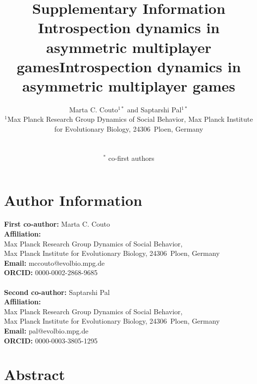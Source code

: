 \documentclass[11pt]{article}
\title{\sffamily \Large Supplementary Information\\[0.1cm] {\bfseries Introspection dynamics in asymmetric multiplayer games}}
\title{\sffamily \Large {\bfseries Introspection dynamics in asymmetric multiplayer games}}
\date{\empty}
\author{\parbox[c]{16cm}{\centering \onehalfspacing \fontsize{11}{12}\selectfont Marta C. Couto$^{1*}$ and Saptarshi Pal$^{1*}$\\[0.2cm]
$^1$Max Planck Research Group Dynamics of Social Behavior, Max Planck Institute for Evolutionary Biology, 24306~Ploen, Germany}\\ \\
$^*$ \fontsize{11}{12}\selectfont co-first authors}
\theoremstyle{plainCl1}
\theoremstyle{plainCl2}
\begin{document}
\maketitle
\onehalfspacing
\section*{Author Information}
\textbf{First co-author:} Marta C. Couto \\
\noindent \textbf{Affiliation:} \\Max Planck Research Group Dynamics of Social Behavior, \\Max Planck Institute for Evolutionary Biology, 24306~Ploen, Germany \\ 
\noindent \textbf{Email:} mccouto@evolbio.mpg.de \\
\noindent \textbf{ORCID:} 0000-0002-2868-9685  \\ \\
\textbf{Second co-author:} Saptarshi Pal \\
\noindent \textbf{Affiliation:} \\Max Planck Research Group Dynamics of Social Behavior, \\Max Planck Institute for Evolutionary Biology, 24306~Ploen, Germany \\ 
\noindent \textbf{Email:} pal@evolbio.mpg.de \\
\noindent \textbf{ORCID:} 0000-0003-3805-1295
\newpage 
\section*{Abstract}

\end{document}
